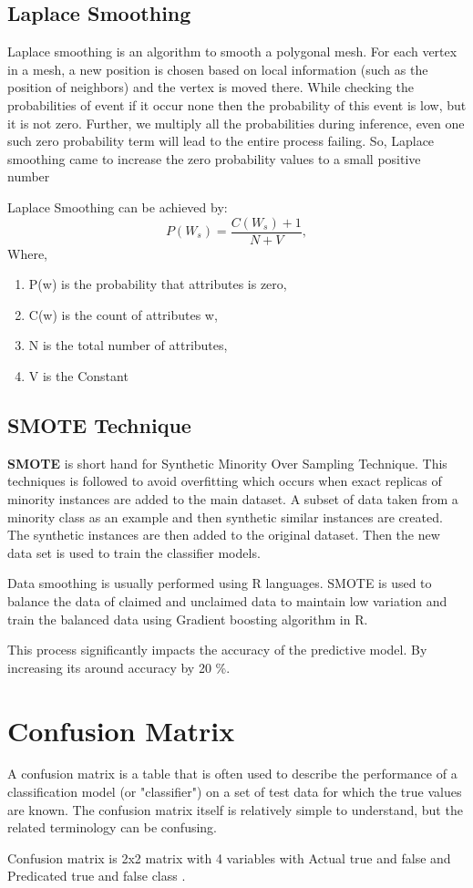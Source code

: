 \subsection{Laplace Smoothing}
Laplace smoothing is an algorithm to smooth a polygonal mesh. For each vertex in a mesh, a new position is chosen based on local information (such as the position of neighbors) and the vertex is moved there. While checking the  probabilities of event if it occur none then the probability of this event is low, but it is not zero. Further, we  multiply all the probabilities during inference, even one such zero probability term will lead to the entire process failing. So, Laplace smoothing came to increase the zero probability values to a small positive number
\par Laplace Smoothing can be achieved by:
$$
P(W_s) = \frac{C(W_s)+1}{N+V},
$$
Where,
\begin{enumerate}
\item P(w) is the  probability that attributes is zero,
\item C(w) is the count of attributes w,
\item N is the total number of attributes,
\item V is the Constant
\end{enumerate}

\subsection{SMOTE Technique}
\textbf{SMOTE} is short hand for Synthetic Minority Over Sampling Technique. This techniques is followed to avoid overfitting which occurs when exact replicas of minority instances are added to the main dataset. A subset of data taken from a minority class as an example and then synthetic similar instances are created. The synthetic instances are then added to the original dataset. Then the new data set is used to train the classifier models.\cite{witten2016data}
\par 
Data smoothing is usually performed using R languages. SMOTE is used to balance the data of claimed and unclaimed data to maintain low variation and train the balanced data using Gradient boosting algorithm in R. 
\par 
This process significantly impacts the accuracy of the predictive model.  By increasing its around accuracy by 20 \%.

\section{Confusion Matrix}
A confusion matrix is a table that is often used to describe the performance of a classification model (or "classifier") on a set of test data for which the true values are known. The confusion matrix itself is relatively simple to understand, but the related terminology can be confusing.	
\par 
Confusion matrix is 2x2 matrix with 4 variables with Actual true and false and Predicated true and false class .


